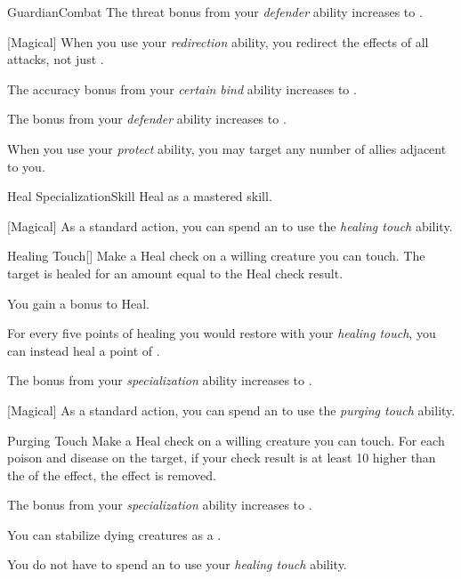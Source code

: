 \begin{feat}{Guardian}{Combat}
         The threat bonus from your \textit{defender} ability increases to .

        [Magical] When you use your \textit{redirection} ability, you redirect the effects of all attacks, not just .

         The accuracy bonus from your \textit{certain bind} ability increases to .

         The bonus from your \textit{defender} ability increases to .

         When you use your \textit{protect} ability, you may target any number of allies adjacent to you.
    \end{feat}

    \begin{feat}{Heal Specialization}{Skill}
        \featpre Heal as a mastered skill.

        [Magical] As a standard action, you can spend an  to use the \textit{healing touch} ability.
        \begin{ability}{Healing Touch}[]
            Make a Heal check on a willing creature you can touch.
            The target is healed for an amount equal to the Heal check result.
        \end{ability}

         You gain a  bonus to Heal.

         For every five points of healing you would restore with your \textit{healing touch}, you can instead heal a point of .

         The bonus from your \textit{specialization} ability increases to .

        [Magical] As a standard action, you can spend an  to use the \textit{purging touch} ability.
        \begin{ability}{Purging Touch}
            Make a Heal check on a willing creature you can touch.
            For each poison and disease on the target, if your check result is at least 10 higher than the  of the effect, the effect is removed.
        \end{ability}

         The bonus from your \textit{specialization} ability increases to .

         You can stabilize dying creatures as a .

         You do not have to spend an  to use your \textit{healing touch} ability.
    \end{feat}

